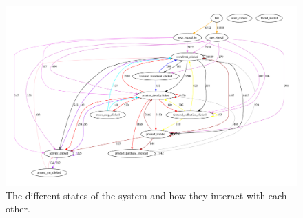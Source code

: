     \begin{figure}[H]
        \includegraphics[angle=90,width=5in]{image/statesInteractionFalse-gvfile.pdf}
        \centering
        \caption[States in session and how they interact]{The different states of the system and how they interact with each other.}
        \label{figure:statesInteractions}
    \end{figure}

